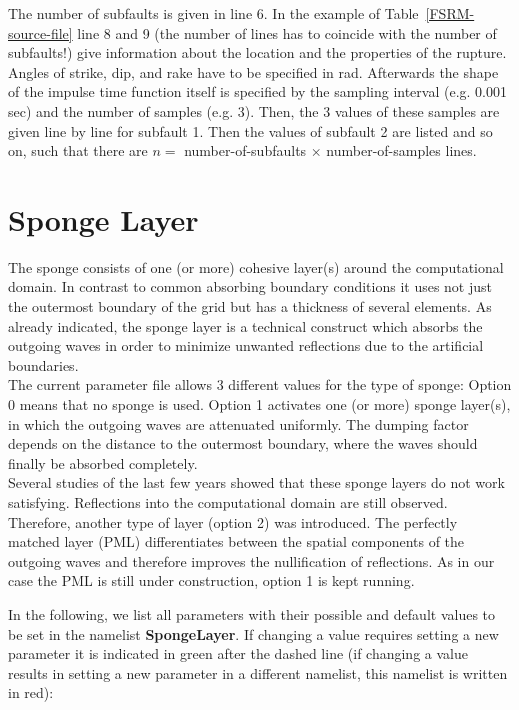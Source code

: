 \documentclass[12pt,twoside]{article}
\begin{document}
The number of subfaults is given in line 6. In the example of Table~\ref{FSRM-source-file} line 8 and 9
(the number of lines has to coincide with the number of subfaults!) give information about the location 
and the properties of the rupture.
Angles of strike, dip, and rake have to be specified in rad.
Afterwards the shape of the impulse time function itself is specified by the sampling interval (e.g. 0.001 sec) 
and the number of samples (e.g. 3). 
Then, the 3 values of these samples are given line by line for subfault 1.
Then the values of subfault 2 are listed and so on, such that there are $n =$ number-of-subfaults $\times$ number-of-samples lines.

\newpage

\section{Sponge Layer}
\label{sec-block-spg}


The sponge consists of one (or more) cohesive layer(s) around the computational domain.
In contrast to common absorbing boundary conditions it uses not just the outermost boundary of the grid 
but has a thickness of several elements. 
As already indicated, the sponge layer is a technical construct which absorbs the outgoing waves 
in order to minimize unwanted reflections due to the artificial boundaries.\\
The current parameter file allows 3 different values for the type of sponge: 
Option 0 means that no sponge is used. 
Option 1 activates one (or more) sponge layer(s), in which the outgoing waves are attenuated uniformly.
The dumping factor depends on the distance to the outermost boundary, where the waves should finally\index{} be absorbed completely.\\
Several studies of the last few years showed that these sponge layers do not work satisfying. 
Reflections into the computational domain are still observed. 
Therefore, another type of layer (option 2) was introduced. 
The perfectly matched layer (PML) differentiates between the spatial components of the outgoing waves and therefore improves the 
nullification of reflections. 
As in our case the PML is still under construction, option 1 is kept running.\\
\newpage

In the following, we list all parameters with their possible and default values to be set in the namelist \textbf{SpongeLayer}. 
If changing a value requires setting a new 
parameter it is indicated in green after the dashed line (if changing a value results in setting a new 
parameter in a different namelist, this namelist is written in red):\\
\end{document}
